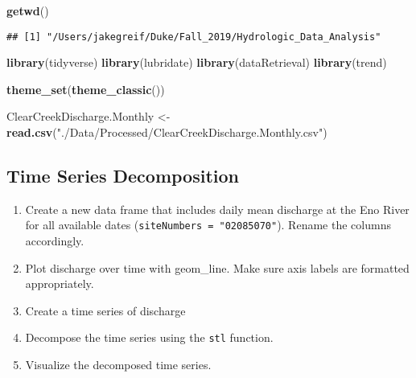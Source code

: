 \documentclass[]{article}
\newenvironment{Shaded}{\begin{snugshade}}{\end{snugshade}}
\newcommand{\KeywordTok}[1]{\textcolor[rgb]{0.13,0.29,0.53}{\textbf{#1}}}
\newcommand{\NormalTok}[1]{#1}
\newcommand{\StringTok}[1]{\textcolor[rgb]{0.31,0.60,0.02}{#1}}
\providecommand{\tightlist}{%
  \setlength{\itemsep}{0pt}\setlength{\parskip}{0pt}}
\begin{document}
\begin{Shaded}
\begin{Highlighting}[]
\KeywordTok{getwd}\NormalTok{()}
\end{Highlighting}
\end{Shaded}

\begin{verbatim}
## [1] "/Users/jakegreif/Duke/Fall_2019/Hydrologic_Data_Analysis"
\end{verbatim}

\begin{Shaded}
\begin{Highlighting}[]
\KeywordTok{library}\NormalTok{(tidyverse)}
\KeywordTok{library}\NormalTok{(lubridate)}
\KeywordTok{library}\NormalTok{(dataRetrieval)}
\KeywordTok{library}\NormalTok{(trend)}

\KeywordTok{theme_set}\NormalTok{(}\KeywordTok{theme_classic}\NormalTok{())}

\NormalTok{ClearCreekDischarge.Monthly <-}\StringTok{ }
\StringTok{  }\KeywordTok{read.csv}\NormalTok{(}\StringTok{"./Data/Processed/ClearCreekDischarge.Monthly.csv"}\NormalTok{)}
\end{Highlighting}
\end{Shaded}

\hypertarget{time-series-decomposition}{%
\subsection{Time Series Decomposition}\label{time-series-decomposition}}

\begin{enumerate}
\def\labelenumi{\arabic{enumi}.}
\setcounter{enumi}{4}
\tightlist
\item
  Create a new data frame that includes daily mean discharge at the Eno
  River for all available dates (\texttt{siteNumbers\ =\ "02085070"}).
  Rename the columns accordingly.
\item
  Plot discharge over time with geom\_line. Make sure axis labels are
  formatted appropriately.
\item
  Create a time series of discharge
\item
  Decompose the time series using the \texttt{stl} function.
\item
  Visualize the decomposed time series.
\end{enumerate}
\end{document}
